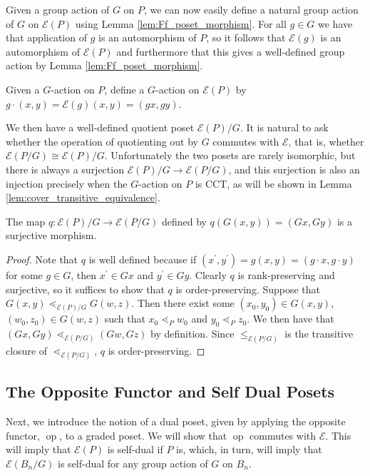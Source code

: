 \documentclass[smallextended, envcountsame, numbook]{svjour3}
\numberwithin{equation}{section}
\newcommand\ssec{\subsection}
\newcommand\op{\operatorname{op}}
\begin{document}
Given a group action of $G$ on $P$, we can now easily define a natural group action of $G$ on $\mathcal E(P)$ using Lemma \ref{lem:Ff_poset_morphism}.  For all $g\in G$ we have that application of $g$ is an automorphism of $P$, so it follows that $\mathcal E(g)$ is an automorphism of $\mathcal E(P)$ and furthermore that this gives a well-defined group action by Lemma \ref{lem:Ff_poset_morphism}.

\begin{definition}\label{note:G_action_on_FP}
Given a $G$-action on $P$, define a $G$-action on $\mathcal E(P)$ by $g\cdot (x,y) = \mathcal{E}(g)(x,y) = (gx,gy)$.
\end{definition}

We then have a well-defined quotient poset $\mathcal E(P)/G$.  It is natural to ask whether the operation of quotienting out by $G$ commutes with $\mathcal E$, that is, whether $\mathcal E(P/G) \cong \mathcal E(P)/G$.  Unfortunately the two posets are rarely isomorphic, but there is always a surjection $\mathcal E(P)/G\rightarrow \mathcal E(P/G)$, and this surjection is also an injection precisely when the $G$-action on $P$ is CCT, as will be shown in Lemma \ref{lem:cover_transitive_equivalence}.


\begin{proposition}\label{prop:surjection_between_F_quotients}
The map $q\colon \mathcal E(P)/G\rightarrow \mathcal E(P/G)$ defined by $q(G(x, y)) = (Gx,Gy)$ is a surjective morphism.
\end{proposition}

\begin{proof}

Note that $q$ is well defined because if $(x^\prime, y^\prime) = g(x, y) = (g\cdot x, g\cdot y)$ for some $g\in G$, then $x^\prime\in Gx$ and $y^\prime\in Gy$.  Clearly $q$ is rank-preserving and surjective, so it suffices to show that $q$ is order-preserving.  Suppose that $G(x, y) \lessdot_{\mathcal E(P)/G} G(w, z)$.  Then there exist some $(x_0, y_0)\in G(x, y)$, $(w_0, z_0)\in G(w, z)$ such that $x_0\lessdot_P w_0$ and $y_0\lessdot_P z_0$.  We then have that $(Gx, Gy) \lessdot_{\mathcal E(P/G)} (Gw, Gz)$ by definition. Since $\le_{\mathcal E(P/G)}$ is the transitive closure of $\lessdot_{\mathcal E(P/G)}$, $q$ is order-preserving.
\end{proof}

\ssec{The Opposite Functor and Self Dual Posets}
\label{ssec:dual_posets}

Next, we introduce the notion of a dual poset, given by applying the opposite functor, $\op$, to a graded poset. We will show that $\op$ commutes with $\mathcal E$. This will imply that $\mathcal E(P)$ is self-dual if $P$ is, which, in turn, will imply that $\mathcal E(B_n/G)$ is self-dual for any group action of $G$ on $B_n$.
\end{document}
